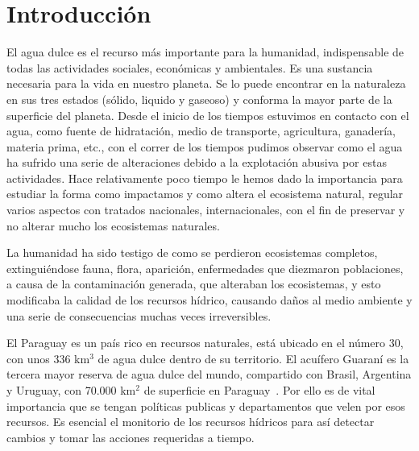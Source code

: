 

\chapter[Introducción]{Introducción}
\pagestyle{fancy}


El agua dulce es el recurso más importante para la humanidad, indispensable de todas las actividades sociales, económicas y ambientales. 
Es una sustancia necesaria para la vida en nuestro planeta. 
Se lo puede encontrar en la naturaleza en sus tres estados (sólido, liquido y gaseoso) y conforma la  mayor parte de la superficie del planeta. 
Desde el inicio de los tiempos estuvimos en contacto con el agua, como fuente de hidratación, medio de transporte, agricultura, ganadería, materia prima, etc., con el correr de los tiempos pudimos observar como el agua ha sufrido una serie de alteraciones debido a la explotación abusiva por estas actividades. 
Hace relativamente poco tiempo le hemos dado la importancia para estudiar la forma como impactamos y como altera el ecosistema natural, regular varios aspectos con tratados nacionales, internacionales, con el fin de preservar y no alterar mucho los ecosistemas naturales. %


La humanidad ha sido testigo de como se  perdieron  ecosistemas completos, extinguiéndose fauna, flora, aparici\'on, enfermedades que diezmaron poblaciones, a causa de la contaminaci\'on generada, que alteraban los ecosistemas, y esto modificaba la calidad de los recursos h\'idrico, causando da\~nos al medio ambiente y una serie de consecuencias muchas veces irreversibles. 

El Paraguay es un pa\'is rico en recursos naturales, está ubicado en el número 30, con unos 336 km$^3$ de agua dulce dentro de su territorio. 
El acuífero Guaraní es la tercera mayor reserva de agua dulce del mundo, compartido con Brasil, Argentina y Uruguay, con 70.000 km$^{2}$ de superficie en Paraguay~\cite{stp_Agua}. 
Por ello es de vital importancia que se tengan políticas publicas y departamentos que velen por esos recursos.
Es esencial el monitorio de los recursos hídricos para así detectar cambios y tomar las acciones requeridas a tiempo.


